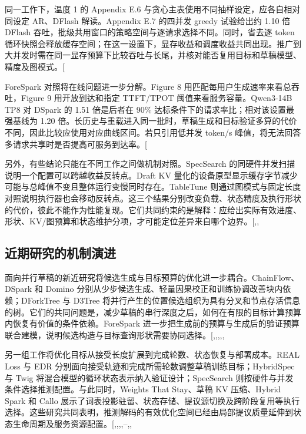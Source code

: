 \documentclass[
  a4paper,
  UTF8,
  fontset=none,
  zihao=5]{ctexart}
\begin{document}
同一工作下，温度 1 的 Appendix E.6
与贪心主表使用不同抽样设定，应各自相对同设定 AR、DFlash 解读。Appendix
E.7 的四并发 greedy 试验给出约 1.10 倍 DFlash
吞吐，批级共用窗口的策略空间与逐请求选择不同。同时，省去逐 token
循环快照会释放缓存空间；在这一设置下，显存收益和调度收益共同出现。推广到大并发时需在同一显存预算下比较吞吐与长尾，并核对能否复用目标和草稿模型、精度及图模式。{[}\citeproc{ref-hybridspec}{7}{]}

ForeSpark 对照将在线问题进一步分解。Figure 8
用匹配每用户生成速率来看总吞吐，Figure 9 用开放到达和指定 TTFT/TPOT
阈值来看服务容量。Qwen3-14B TP8 对 DSpark 的 1.51 倍是后者在 90\%
达标条件下的请求率比；相对该设置最强基线为 1.20
倍。长历史与重载进入同一批时，草稿生成和目标验证多算的代价不同，因此比较应使用对应曲线区间。若只引用低并发
token/s
峰值，将无法回答多请求共享时是否提高可服务到达率。{[}\citeproc{ref-forespark}{14}{]}

另外，有些结论只能在不同工作之间做机制对照。SpecSearch
的同硬件并发扫描说明一个配置可以跨越收益反转点。Draft KV
量化的设备原型显示缓存字节减少可能与总峰值不变且整体运行变慢同时存在。TableTune
则通过图模式与固定长度对照说明执行器也会移动反转点。这三个结果分别改变负载、状态精度及执行形状的代价，彼此不能作为性能复现。它们共同约束的是解释：应给出实际有效进度、形状、KV/图预算和状态维护分项，才可能定位差异来自哪个边界。{[},,\citeproc{ref-draftkv}{72}{]}

\subsection{近期研究的机制演进}\label{november}

面向并行草稿的新近研究将候选生成与目标预算的优化进一步耦合。ChainFlow、DSpark
和 Domino
分别从少步候选生成、轻量因果校正和训练协调改善块内依赖；DForkTree 与
D3Tree
将并行产生的位置候选组织为具有分叉和节点存活信息的树。它们的共同问题是，减少草稿的串行深度之后，如何在有限的目标计算预算内恢复有价值的条件依赖。ForeSpark
进一步把生成前的预算与生成后的验证预算联合建模，说明候选构造与目标查询形状需要协同选择。{[},,,,,\citeproc{ref-d3tree}{49}{]}

另一组工作将优化目标从接受长度扩展到完成轮数、状态恢复与部署成本。REAL
Loss 与 EDR 分别面向接受轨迹和完成所需轮数调整草稿训练目标；HybridSpec
与 Twig 将混合模型的循环状态表示纳入验证设计；SpecSearch
则按硬件与并发条件选择推测配置。与此同时，Weights That Stay、草稿 KV
压缩、Hybrid Spark 和 Callo
展示了词表投影驻留、状态存储、提议源切换及跨阶段复用等执行选择。这些研究共同表明，推测解码的有效优化空间已经由局部提议质量延伸到状态生命周期及服务资源配置。{[},,,,--,,\citeproc{ref-draftkv}{72}{]}
\end{document}

